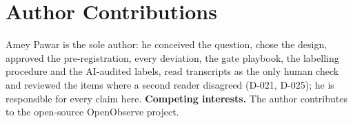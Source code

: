 \section*{Author Contributions}\label{sec:authors}
Amey Pawar is the sole author: he conceived the question, chose the design, approved the pre-registration, every deviation, the gate playbook, the labelling procedure and the AI-audited labels, read \wtthHumanReadSelectedN{} transcripts as the only human check and reviewed the \wtthHumanReadAdjShownK{} items where a second reader disagreed (D-021, D-025); he is responsible for every claim here.
\textbf{Competing interests.} The author contributes to the open-source OpenObserve project.
